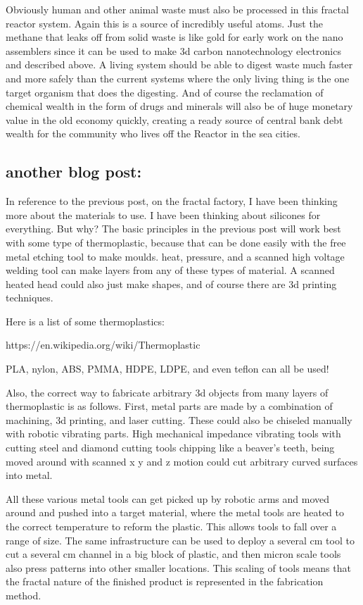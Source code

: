 Obviously human and other animal waste must also be processed in this
fractal reactor system. Again this is a source of incredibly useful
atoms. Just the methane that leaks off from solid waste is like gold for
early work on the nano assemblers since it can be used to make 3d carbon
nanotechnology electronics and described above. A living system should
be able to digest waste much faster and more safely than the current
systems where the only living thing is the one target organism that does
the digesting. And of course the reclamation of chemical wealth in the
form of drugs and minerals will also be of huge monetary value in the
old economy quickly, creating a ready source of central bank debt wealth
for the community who lives off the Reactor in the sea cities.

\subsection{another blog post:}\label{another-blog-post}

In reference to the previous post, on the fractal factory, I have been
thinking more about the materials to use. I have been thinking about
silicones for everything. But why? The basic principles in the previous
post will work best with some type of thermoplastic, because that can be
done easily with the free metal etching tool to make moulds. heat,
pressure, and a scanned high voltage welding tool can make layers from
any of these types of material. A scanned heated head could also just
make shapes, and of course there are 3d printing techniques.

Here is a list of some thermoplastics:

https://en.wikipedia.org/wiki/Thermoplastic

PLA, nylon, ABS, PMMA, HDPE, LDPE, and even teflon can all be used!

Also, the correct way to fabricate arbitrary 3d objects from many layers
of thermoplastic is as follows. First, metal parts are made by a
combination of machining, 3d printing, and laser cutting. These could
also be chiseled manually with robotic vibrating parts. High mechanical
impedance vibrating tools with cutting steel and diamond cutting tools
chipping like a beaver's teeth, being moved around with scanned x y and
z motion could cut arbitrary curved surfaces into metal.

All these various metal tools can get picked up by robotic arms and
moved around and pushed into a target material, where the metal tools
are heated to the correct temperature to reform the plastic. This allows
tools to fall over a range of size. The same infrastructure can be used
to deploy a several cm tool to cut a several cm channel in a big block
of plastic, and then micron scale tools also press patterns into other
smaller locations. This scaling of tools means that the fractal nature
of the finished product is represented in the fabrication method.

